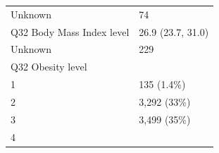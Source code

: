 \documentclass[]{article}
\begin{document}
\begin{longtable}[]{@{}ll@{}}
\begin{minipage}[t]{0.71\columnwidth}\raggedright
Unknown\strut
\end{minipage} & \begin{minipage}[t]{0.23\columnwidth}\raggedright
74\strut
\end{minipage}\tabularnewline
\begin{minipage}[t]{0.71\columnwidth}\raggedright
Q32 Body Mass Index level\strut
\end{minipage} & \begin{minipage}[t]{0.23\columnwidth}\raggedright
26.9 (23.7, 31.0)\strut
\end{minipage}\tabularnewline
\begin{minipage}[t]{0.71\columnwidth}\raggedright
Unknown\strut
\end{minipage} & \begin{minipage}[t]{0.23\columnwidth}\raggedright
229\strut
\end{minipage}\tabularnewline
\begin{minipage}[t]{0.71\columnwidth}\raggedright
Q32 Obesity level\strut
\end{minipage} & \begin{minipage}[t]{0.23\columnwidth}\raggedright
\strut
\end{minipage}\tabularnewline
\begin{minipage}[t]{0.71\columnwidth}\raggedright
1\strut
\end{minipage} & \begin{minipage}[t]{0.23\columnwidth}\raggedright
135 (1.4\%)\strut
\end{minipage}\tabularnewline
\begin{minipage}[t]{0.71\columnwidth}\raggedright
2\strut
\end{minipage} & \begin{minipage}[t]{0.23\columnwidth}\raggedright
3,292 (33\%)\strut
\end{minipage}\tabularnewline
\begin{minipage}[t]{0.71\columnwidth}\raggedright
3\strut
\end{minipage} & \begin{minipage}[t]{0.23\columnwidth}\raggedright
3,499 (35\%)\strut
\end{minipage}\tabularnewline
\begin{minipage}[t]{0.71\columnwidth}\raggedright
4\strut
\end{minipage} & \begin{minipage}[t]{0.23\columnwidth}\raggedright

\end{minipage}
\end{longtable}
\end{document}
